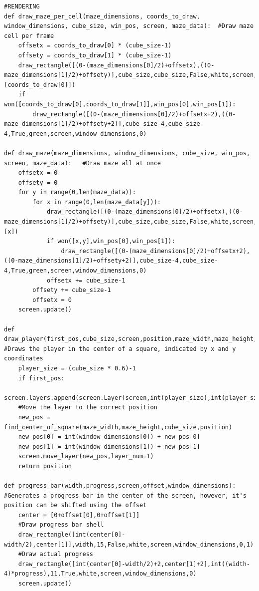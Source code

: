 \documentclass{article}
\begin{document}
\begin{lstlisting}
#RENDERING
def draw_maze_per_cell(maze_dimensions, coords_to_draw, window_dimensions, cube_size, win_pos, screen, maze_data):  #Draw maze cell per frame
    offsetx = coords_to_draw[0] * (cube_size-1)
    offsety = coords_to_draw[1] * (cube_size-1)
    draw_rectangle([(0-(maze_dimensions[0]/2)+offsetx),((0-maze_dimensions[1]/2)+offsety)],cube_size,cube_size,False,white,screen,window_dimensions,0,maze_data[coords_to_draw[1]][coords_to_draw[0]])
    if won([coords_to_draw[0],coords_to_draw[1]],win_pos[0],win_pos[1]):
        draw_rectangle([(0-(maze_dimensions[0]/2)+offsetx+2),((0-maze_dimensions[1]/2)+offsety+2)],cube_size-4,cube_size-4,True,green,screen,window_dimensions,0)

def draw_maze(maze_dimensions, window_dimensions, cube_size, win_pos, screen, maze_data):   #Draw maze all at once
    offsetx = 0
    offsety = 0
    for y in range(0,len(maze_data)):
        for x in range(0,len(maze_data[y])):
            draw_rectangle([(0-(maze_dimensions[0]/2)+offsetx),((0-maze_dimensions[1]/2)+offsety)],cube_size,cube_size,False,white,screen,window_dimensions,0,maze_data[y][x])
            if won([x,y],win_pos[0],win_pos[1]):
                draw_rectangle([(0-(maze_dimensions[0]/2)+offsetx+2),((0-maze_dimensions[1]/2)+offsety+2)],cube_size-4,cube_size-4,True,green,screen,window_dimensions,0)
            offsetx += cube_size-1
        offsety += cube_size-1
        offsetx = 0
    screen.update()   

def draw_player(first_pos,cube_size,screen,position,maze_width,maze_height,window_dimensions): #Draws the player in the center of a square, indicated by x and y coordinates
    player_size = (cube_size * 0.6)-1
    if first_pos:
        screen.layers.append(screen.Layer(screen,int(player_size),int(player_size),255))
    #Move the layer to the correct position
    new_pos = find_center_of_square(maze_width,maze_height,cube_size,position)
    new_pos[0] = int(window_dimensions[0]) + new_pos[0] 
    new_pos[1] = int(window_dimensions[1]) + new_pos[1]
    screen.move_layer(new_pos,layer_num=1)
    return position

def progress_bar(width,progress,screen,offset,window_dimensions): #Generates a progress bar in the center of the screen, however, it's position can be shifted using the offset
    center = [0+offset[0],0+offset[1]]
    #Draw progress bar shell
    draw_rectangle([int(center[0]-width/2),center[1]],width,15,False,white,screen,window_dimensions,0,1)
    #Draw actual progress
    draw_rectangle([int(center[0]-width/2)+2,center[1]+2],int((width-4)*progress),11,True,white,screen,window_dimensions,0)
    screen.update()


\end{lstlisting}
\end{document}
